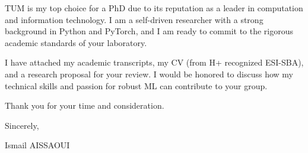 \documentclass[11pt,a4paper]{article}
\begin{document}
TUM is my top choice for a PhD due to its reputation as a leader in computation and information technology. I am a self-driven researcher with a strong background in Python and PyTorch, and I am ready to commit to the rigorous academic standards of your laboratory.

I have attached my academic transcripts, my CV (from H+ recognized ESI-SBA), and a research proposal for your review. I would be honored to discuss how my technical skills and passion for robust ML can contribute to your group.

Thank you for your time and consideration.

Sincerely,

\bigskip

\noindent Ismail AISSAOUI
\end{document}
